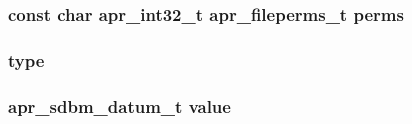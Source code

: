 \subsubsection[{\texorpdfstring{perms}{perms}}]{\setlength{\rightskip}{0pt plus 5cm}const char {\bf apr\+\_\+int32\+\_\+t} {\bf apr\+\_\+fileperms\+\_\+t} perms}\hypertarget{group__APR__Util__DBM__SDBM_ga4644cd2c8097d1b754ec32f7c5ea6d5b}{}\label{group__APR__Util__DBM__SDBM_ga4644cd2c8097d1b754ec32f7c5ea6d5b}
\subsubsection[{\texorpdfstring{type}{type}}]{ type}\hypertarget{group__APR__Util__DBM__SDBM_gac765329451135abec74c45e1897abf26}{}\label{group__APR__Util__DBM__SDBM_gac765329451135abec74c45e1897abf26}
\subsubsection[{\texorpdfstring{value}{value}}]{ {\bf apr\+\_\+sdbm\+\_\+datum\+\_\+t} value}\hypertarget{group__APR__Util__DBM__SDBM_ga711ebc0efad43aba10f32ded4a28cf17}{}\label{group__APR__Util__DBM__SDBM_ga711ebc0efad43aba10f32ded4a28cf17}

